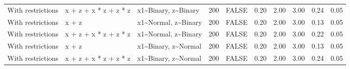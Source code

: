 \begin{longtable}{lllrlrrrrr}
  With restrictions & x + z + x * z + z * z & x1\~{}Binary, z\~{}Binary & 200 & FALSE & 0.20 & 2.00 & 3.00 & 0.24 & 0.05 \\ 
  With restrictions & x + z & x1\~{}Normal, z\~{}Binary & 200 & FALSE & 0.20 & 2.00 & 3.00 & 0.13 & 0.05 \\ 
  With restrictions & x + z + x * z + z * z & x1\~{}Normal, z\~{}Binary & 200 & FALSE & 0.20 & 2.00 & 3.00 & 0.22 & 0.05 \\ 
  With restrictions & x + z & x1\~{}Binary, z\~{}Normal & 200 & FALSE & 0.20 & 2.00 & 3.00 & 0.13 & 0.05 \\ 
  With restrictions & x + z + x * z + z * z & x1\~{}Binary, z\~{}Normal & 200 & FALSE & 0.20 & 2.00 & 3.00 & 0.24 & 0.05 \\ 
   \hline
\hline
\end{longtable}
